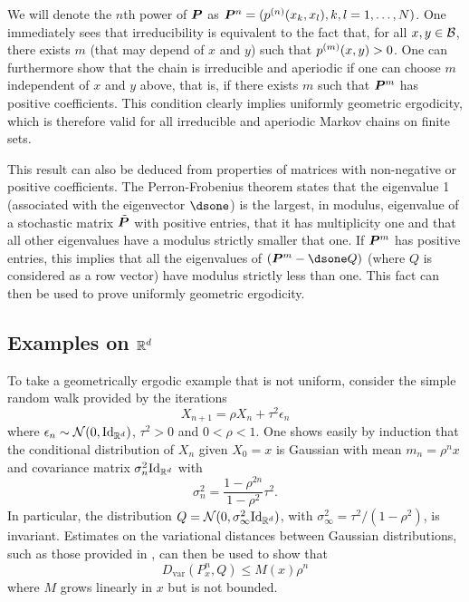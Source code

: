 We will  denote the $n$th power of ${\bm{P}}$ as ${\bm{P}}^n = (p^{(n)}(x_k,x_l), k,l=1, \ldots, N)$. One immediately sees that irreducibility is equivalent to the fact that, for all $x, y\in {\mathcal B}$, there exists $m$ (that may depend of $x$ and $y$) such that $p^{(m)}(x,y) >0$. One can furthermore 
show that the chain is irreducible and aperiodic if one can choose $m$ independent of $x$ and $y$ above, that is, if there exists $m$ such that ${\bm{P}}^m$ has positive coefficients. This condition clearly implies uniformly geometric ergodicity, which is therefore valid for all irreducible and aperiodic Markov chains on finite sets.

This result can also be deduced from properties of matrices with non-negative or positive coefficients. The Perron-Frobenius theorem \cite{horn2012matrix} states that the eigenvalue 1 (associated with the eigenvector $\dsone$) is the largest, in modulus, eigenvalue of   a stochastic matrix $\tilde{{\bm{P}}}$ with positive entries, that it has multiplicity one and that all other eigenvalues have a modulus strictly smaller that one. If ${\bm{P}}^m$ has positive entries, this implies that all the eigenvalues of $(\bfP^m - \dsone Q)$ (where $Q$ is considered as a row vector) have modulus strictly less than one. This fact can then be used to prove uniformly geometric ergodicity. 

\subsection{Examples on ${\mathbb{R}}^d$}
\label{sec:mcmc.rd}
To take a geometrically ergodic example that is not uniform, consider the simple random walk provided by the iterations
\[
X_{n+1} = \rho X_n + \tau^2 \epsilon_n
\]
where $\epsilon_n \sim \CN(0, \Id[d])$, $\tau^2>0$ and $0<\rho < 1$. One shows easily by induction that the conditional distribution of $X_n$ given $X_0=x$ is Gaussian with mean $m_n = \rho^n x$ and covariance matrix $\sigma_n^2 \Id[d]$  with
\[
\sigma^2_n = \frac{1-\rho^{2n}}{1-\rho^2}\tau^2.
\]
In particular, the distribution $Q = \CN(0, \sigma^2_\infty\Id[d])$, with $\sigma^2_\infty = \tau^2 /(1-\rho^2)$, is invariant. Estimates on the variational distances between Gaussian distributions, such as those provided in  \citet{devroye2018total}, can then be used to show that 
\[
D_{\mathrm{var}}(P^n_x, Q) \leq M(x) \rho^n
\]
where $M$ grows linearly in $x$ but is not bounded. 


